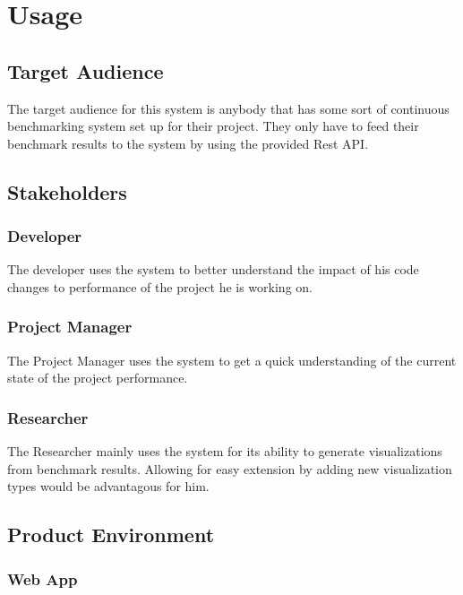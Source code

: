 \section{Usage}

\subsection{Target Audience}

The target audience for this system is anybody that has some sort of continuous benchmarking system set up for their project. They only have to feed their benchmark results to the system by using the provided Rest API.

\subsection{Stakeholders}

\subsubsection*{Developer}

The developer uses the system to better understand the impact of his code changes to performance of the project he is working on.

\subsubsection*{Project Manager}

The Project Manager uses the system to get a quick understanding of the current state of the project performance.

\subsubsection*{Researcher}

The Researcher mainly uses the system for its ability to generate \glspl{visualization} from benchmark results. Allowing for easy extension by adding new \gls{visualization} types would be advantagous for him.


\subsection{Product Environment}

\subsubsection{Web App}

